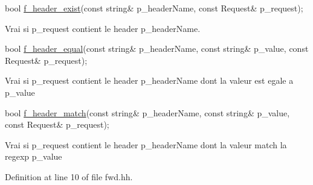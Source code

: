 \begin{DoxyItemize}
\item 
\begin{DoxyCode}
\textcolor{keywordtype}{bool} \hyperlink{classxtd_1_1network_1_1http_1_1Server_a5994c8b6d70b220ded5ab33a73b3295f}{f\_header\_exist}(\textcolor{keyword}{const} \textcolor{keywordtype}{string}& p\_headerName, \textcolor{keyword}{const} Request& p\_request); 
\end{DoxyCode}
 Vrai si p\-\_\-request contient le header p\-\_\-header\-Name. \par
\par
 \par
\par

\item 
\begin{DoxyCode}
\textcolor{keywordtype}{bool} \hyperlink{classxtd_1_1network_1_1http_1_1Server_a3216fa7e19f62235f9988b681f33a06d}{f\_header\_equal}(\textcolor{keyword}{const} \textcolor{keywordtype}{string}& p\_headerName, \textcolor{keyword}{const} \textcolor{keywordtype}{string}& p\_value, \textcolor{keyword}{const} Request& 
      p\_request); 
\end{DoxyCode}
 \par
\par
 Vrai si p\-\_\-request contient le header p\-\_\-header\-Name dont la valeur est egale a p\-\_\-value \par
\par

\item 
\begin{DoxyCode}
\textcolor{keywordtype}{bool} \hyperlink{classxtd_1_1network_1_1http_1_1Server_a60788c00e470ed21293129be27e7115c}{f\_header\_match}(\textcolor{keyword}{const} \textcolor{keywordtype}{string}& p\_headerName, \textcolor{keyword}{const} \textcolor{keywordtype}{string}& p\_value, \textcolor{keyword}{const} Request& 
      p\_request); 
\end{DoxyCode}
 \par
\par
 Vrai si p\-\_\-request contient le header p\-\_\-header\-Name dont la valeur match la regexp p\-\_\-value \par
\par
 
\end{DoxyItemize}

Definition at line 10 of file fwd.\-hh.



